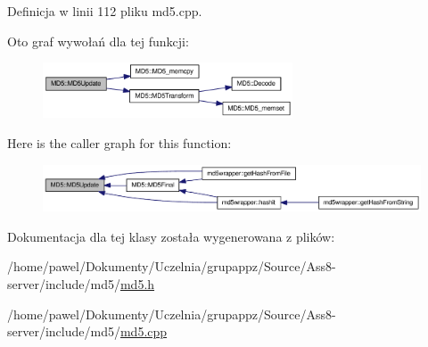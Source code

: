 Definicja w linii 112 pliku md5.cpp.

Oto graf wywołań dla tej funkcji:\nopagebreak
\begin{figure}[H]
\begin{center}
\leavevmode
\includegraphics[width=210pt]{d7/d46/a00002_a59116f0a26354a217fa186a43cd9d28_cgraph}
\end{center}
\end{figure}


Here is the caller graph for this function:\nopagebreak
\begin{figure}[H]
\begin{center}
\leavevmode
\includegraphics[width=320pt]{d7/d46/a00002_a59116f0a26354a217fa186a43cd9d28_icgraph}
\end{center}
\end{figure}


Dokumentacja dla tej klasy została wygenerowana z plików:\begin{CompactItemize}
\item 
/home/pawel/Dokumenty/Uczelnia/grupappz/Source/Ass8-server/include/md5/\hyperlink{a00010}{md5.h}\item 
/home/pawel/Dokumenty/Uczelnia/grupappz/Source/Ass8-server/include/md5/\hyperlink{a00009}{md5.cpp}\end{CompactItemize}
